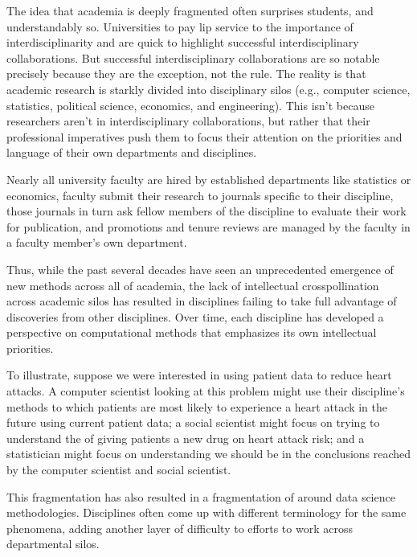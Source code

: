 \documentclass[letterpaper,10pt,english]{jupyterBook}
\begin{document}
\sphinxAtStartPar
The idea that academia is deeply fragmented often surprises students, and understandably so. Universities  to pay lip service to the importance of interdisciplinarity and are quick to highlight successful interdisciplinary collaborations. But successful interdisciplinary collaborations are so notable precisely because they are the exception, not the rule. The reality is that academic research is starkly divided into disciplinary silos (e.g., computer science, statistics, political science, economics, and engineering). This isn’t because researchers aren’t  in interdisciplinary collaborations, but rather that their professional imperatives push them to focus their attention on the priorities and language of their own departments and disciplines.%
\begin{footnote}[2]\sphinxAtStartFootnote
Nearly all university faculty are hired by established departments like statistics or economics, faculty submit their research to journals specific to their discipline, those journals in turn ask fellow members of the discipline to evaluate their work for publication, and promotions and tenure reviews are managed by the faculty in a faculty member’s own department.
%
\end{footnote}

\sphinxAtStartPar
Thus, while the past several decades have seen an unprecedented emergence of new methods across all of academia, the lack of intellectual cross\sphinxhyphen{}pollination across academic silos has resulted in disciplines failing to take full advantage of discoveries from other disciplines. Over time, each discipline has developed a perspective on computational methods that emphasizes its own intellectual priorities.

\sphinxAtStartPar
To illustrate, suppose we were interested in using patient data to reduce heart attacks. A computer scientist looking at this problem might use their discipline’s methods to  which patients are most likely to experience a heart attack in the future using current patient data; a social scientist might focus on trying to understand the  of giving patients a new drug on heart attack risk; and a statistician might focus on understanding  we should be in the conclusions reached by the computer scientist and social scientist.

\sphinxAtStartPar
This fragmentation has also resulted in a fragmentation of  around data science methodologies. Disciplines often come up with different terminology for the same phenomena, adding another layer of difficulty to efforts to work across departmental silos.
\end{document}
